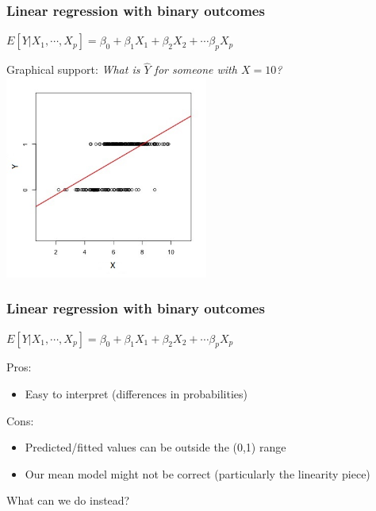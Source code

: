 \documentclass[12pt, 
hyperref={colorlinks=true, linkcolor=blue, urlcolor=cyan}]{beamer}
\begin{document}
\begin{frame}[noframenumbering]
\frametitle{Linear regression with binary outcomes}
\begin{center} $E[Y|X_1,\cdots,X_p] = \beta_0 + \beta_1 X_1 + \beta_2 X_2 + \cdots \beta_p X_p$ \end{center}

\color{blue} Graphical support: \color{black} \textit{What is $\hat{Y}$ for someone with $X = 10$?}
\vspace{-0.4cm}
\center
\includegraphics[width=0.5\textwidth]{figs/contX-lm}
\end{frame}


\begin{frame}
\frametitle{Linear regression with binary outcomes}
\begin{center} $E[Y|X_1,\cdots,X_p] = \beta_0 + \beta_1 X_1 + \beta_2 X_2 + \cdots \beta_p X_p$ \end{center}

Pros: \vspace{-0.3cm}
\begin{itemize}
\item Easy to interpret (differences in probabilities)
\end{itemize}

Cons: \vspace{-0.3cm}
\begin{itemize}
\item Predicted/fitted values can be outside the (0,1) range
\item Our mean model might not be correct (particularly the linearity piece)%
\end{itemize}

What can we do instead?
\end{frame}
\end{document}
